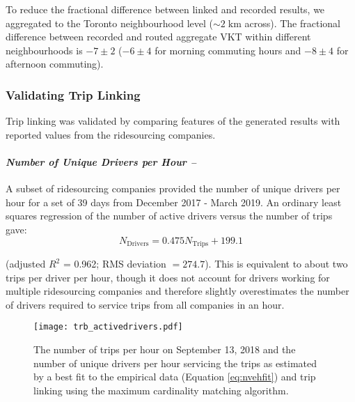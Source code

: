 \documentclass[]{trbunofficial_bdit_final}
\begin{document}
To reduce the fractional difference between linked and recorded results, we
aggregated to the Toronto neighbourhood level (\(\sim 2\;\mathrm{km}\) across).
The fractional difference between recorded and routed aggregate VKT within
different neighbourhoods is \(-7 \pm 2\) (\(-6 \pm 4\) for morning
commuting hours and \(-8 \pm 4\) for afternoon commuting).

\hypertarget{validating-trip-linking}{%
\subsubsection{Validating Trip Linking}\label{validating-trip-linking}}

Trip linking was validated by comparing features of the generated results with
reported values from the ridesourcing companies.

\hypertarget{number-of-unique-drivers-per-hour}{%
\paragraph{\texorpdfstring{\emph{Number of Unique Drivers per Hour --}}{Number of Unique Drivers per Hour --}}\label{number-of-unique-drivers-per-hour}}

A subset of ridesourcing companies provided the number of unique drivers per
hour for a set of 39 days from December 2017 - March 2019. An ordinary least
squares regression of the number of active drivers versus the number of
trips gave:
\begin{equation}N_\mathrm{Drivers} = 0.475 N_\mathrm{Trips} + 199.1\label{eq:nvehfit}\end{equation}

\noindent (adjusted \(R^2\) = 0.962; RMS deviation \(= 274.7\)). This is equivalent
to about two trips per driver per hour, though it does not account for drivers
working for multiple ridesourcing companies and therefore slightly
overestimates the number of drivers required to service trips from all
companies in an hour.

\begin{figure}
\centering
\texttt{[image: trb\_activedrivers.pdf]}
\caption{The number of trips per hour on September 13, 2018 and the number of
unique drivers per hour servicing the trips as estimated by a best fit to the
empirical data (Equation \ref{eq:nvehfit}) and trip linking using the maximum
cardinality matching algorithm.
\label{fig:tripsperhour}}
\end{figure}
\end{document}
